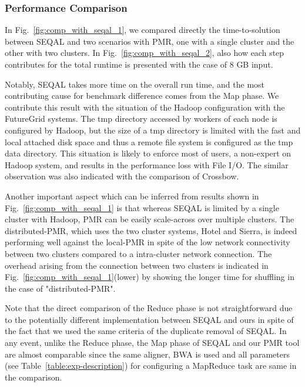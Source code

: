 \documentclass{acm_proc_article-sp}
\begin{document}
\subsubsection{Performance Comparison}
In Fig.~\ref{fig:comp_with_seqal_1}, we compared directly the time-to-solution between SEQAL and two scenarios with PMR, one with a single cluster and the other with two clusters.  In Fig.~\ref{fig:comp_with_seqal_2}, also how each step contributes for the total runtime is presented with the case of 8 GB input.  

Notably, SEQAL takes more time on the overall run time, and the most
contributing cause for benchmark difference comes from the Map phase.
We contribute this result with the situation of the Hadoop
configuration with the FutureGrid systems.  The tmp directory accessed
by workers of each node is configured by Hadoop, but the size of a tmp
directory is limited with the fast and local attached disk space and
thus a remote file system is configured as the tmp data directory.
This situation is likely to enforce most of users, a non-expert on
Hadoop system, and results in the performance loss with File I/O.  The
similar observation was also indicated with the comparison of
Crossbow.

Another important aspect which can be inferred from results shown in
Fig.~\ref{fig:comp_with_seqal_1} is that whereas SEQAL is limited by a
single cluster with Hadoop, PMR can be easily scale-across over
multiple clusters. The distributed-PMR, which uses the two cluster
systems, Hotel and Sierra, is indeed performing well against the
local-PMR in spite of the low network connectivity between two
clusters compared to a intra-cluster network connection.  The overhead
arising from the connection between two clusters is indicated in
Fig.~\ref{fig:comp_with_seqal_1}(lower) by showing the longer time for
shuffling in the case of "distributed-PMR".

Note that the direct comparison of the Reduce phase is not straightforward due to the potentially different implementation between SEQAL and ours in spite of the fact that we used the same criteria of the duplicate removal of SEQAL\cite{seal_2011_mapred}.  In any event, unlike the Reduce phase, the Map phase of SEQAL and our PMR tool are almost comparable since the same aligner, BWA is used and all parameters (see Table~\ref{table:exp-description}) for configuring a MapReduce task are same in the comparison.   
\end{document}
